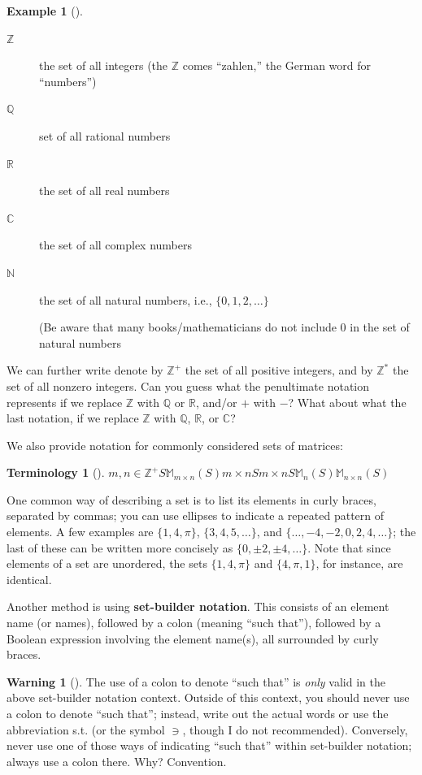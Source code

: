 \documentclass[10pt,]{book}
\newcommand{\terminology}[1]{\textbf{#1}}
\theoremstyle{plain}
\theoremstyle{definition}
\theoremstyle{definition}
\newtheorem{warning}[theorem]{Warning}
\newtheorem{insight}[theorem]{Terminology}
\theoremstyle{definition}
\newtheorem{example}[theorem]{Example}
\theoremstyle{definition}
\numberwithin{equation}{section}
\def\Z{\mathbb{Z}}
\def\R{\mathbb{R}}
\def\Q{\mathbb{Q}}
\def\C{\mathbb{C}}
\def\N{\mathbb{N}}
\def\M{\mathbb{M}}
\begin{document}
\begin{example}[]\label{example-1}
\leavevmode%
\begin{description}
\item[{\(\Z\)}]\hypertarget{li-1}{}the set of all integers  (the \(\Z\) comes ``zahlen,'' the German word for ``numbers'')%
\item[{\(\Q\)}]\hypertarget{li-2}{}set of all rational numbers%
\item[{\(\R\)}]\hypertarget{li-3}{}the set of all real numbers%
\item[{\(\C\)}]\hypertarget{li-4}{}the set of all complex numbers%
\item[{\(\N\)}]\hypertarget{li-5}{}the set of all natural numbers, i.e., \(\{0, 1, 2, \ldots\}\)%
\par
(Be aware that many books/mathematicians do not include \(0\) in the set of natural numbers%
\end{description}
 We can further write denote by \(\Z^+\) the set of all positive integers, and by \(\Z^*\) the set of all nonzero integers. Can you guess what the penultimate notation represents if we replace \(\Z\) with \(\Q\) or \(\R\), and/or \(+\) with \(-\)? What about what the last notation, if we replace \(\Z\) with \(\Q\), \(\R\), or \(\C\)?%
\label{notation-4}
\label{notation-5}
\label{notation-6}
\label{notation-7}
\label{notation-8}
\label{notation-9}
\label{notation-10}
\label{notation-11}
\end{example}
We also provide notation for commonly considered sets of matrices:%
\begin{insight}[]\label{insight-1}
\(m,n\in \Z^+\)\(S\)\(\M_{m\times n}(S)\)\(m\times n\)\(S\)\(m\times n\)\(S\)\(\M_n(S)\)\(\M_{n\times n}(S)\)\end{insight}
One common way of describing a set is to list its elements in curly braces, separated by commas; you can use ellipses to indicate a repeated pattern of elements. A few examples are \(\{1,4,\pi\}\), \(\{3, 4, 5, \ldots\}\), and \(\{\ldots, -4, -2, 0,
2, 4, \ldots\}\); the last of these can be written more concisely as \(\{0,\pm 2, \pm 4,\ldots\}\). Note that since elements of a set are unordered, the sets \(\{1,4,\pi\}\) and \(\{4,\pi, 1\}\), for instance, are identical.%
\par
Another method is using \terminology{set-builder notation}. This consists of an element name (or names), followed by a colon (meaning ``such that''), followed by a Boolean expression involving the element name(s), all surrounded by curly braces. \begin{warning}[]\label{warning-1}
The use of a colon to denote ``such that'' is \emph{only} valid in the above set-builder notation context.  Outside of this context, you should never use a colon to denote ``such that''; instead, write out the actual words or use the abbreviation s.t. (or the symbol \(\ni\), though I do not recommended).  Conversely, never use one of those ways of indicating ``such that'' within set-builder notation; always use a colon there.  Why?  Convention.%
\end{warning}
\end{document}
